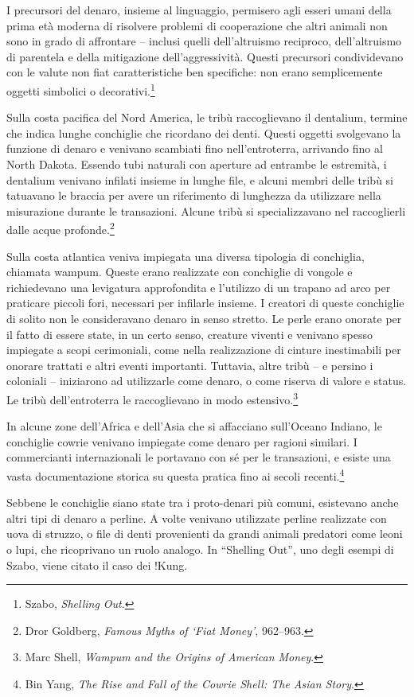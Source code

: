 \documentclass[
  a5paper,
  smalldemyvopaper,10pt,twoside,onecolumn,openright,extrafontsizes,hidelinks]{memoir}
\begin{document}
I precursori del denaro, insieme al linguaggio, permisero agli esseri
umani della prima età moderna di risolvere problemi di cooperazione che
altri animali non sono in grado di affrontare -- inclusi quelli
dell'altruismo reciproco, dell'altruismo di parentela e della
mitigazione dell'aggressività. Questi precursori condividevano con le
valute non fiat caratteristiche ben specifiche: non erano semplicemente
oggetti simbolici o decorativi.\footnote{Szabo, \emph{Shelling Out}.}

Sulla costa pacifica del Nord America, le tribù raccoglievano il
dentalium, termine che indica lunghe conchiglie che ricordano dei denti.
Questi oggetti svolgevano la funzione di denaro e venivano scambiati
fino nell'entroterra, arrivando fino al North Dakota. Essendo tubi
naturali con aperture ad entrambe le estremità, i dentalium venivano
infilati insieme in lunghe file, e alcuni membri delle tribù si
tatuavano le braccia per avere un riferimento di lunghezza da utilizzare
nella misurazione durante le transazioni. Alcune tribù si
specializzavano nel raccoglierli dalle acque profonde.\footnote{Dror
  Goldberg, \emph{Famous Myths of `Fiat Money'}, 962--963.}

Sulla costa atlantica veniva impiegata una diversa tipologia di
conchiglia, chiamata wampum. Queste erano realizzate con conchiglie di
vongole e richiedevano una levigatura approfondita e l'utilizzo di un
trapano ad arco per praticare piccoli fori, necessari per infilarle
insieme. I creatori di queste conchiglie di solito non le consideravano
denaro in senso stretto. Le perle erano onorate per il fatto di essere
state, in un certo senso, creature viventi e venivano spesso impiegate a
scopi cerimoniali, come nella realizzazione di cinture inestimabili per
onorare trattati e altri eventi importanti. Tuttavia, altre tribù -- e
persino i coloniali -- iniziarono ad utilizzarle come denaro, o come
riserva di valore e status. Le tribù dell'entroterra le raccoglievano in
modo estensivo.\footnote{Marc Shell, \emph{Wampum and the Origins of
  American Money}.}

In alcune zone dell'Africa e dell'Asia che si affacciano sull'Oceano
Indiano, le conchiglie cowrie venivano impiegate come denaro per ragioni
similari. I commercianti internazionali le portavano con sé per le
transazioni, e esiste una vasta documentazione storica su questa pratica
fino ai secoli recenti.\footnote{Bin Yang, \emph{The Rise and Fall of
  the Cowrie Shell: The Asian Story}.}

Sebbene le conchiglie siano state tra i proto-denari più comuni,
esistevano anche altri tipi di denaro a perline. A volte venivano
utilizzate perline realizzate con uova di struzzo, o file di denti
provenienti da grandi animali predatori come leoni o lupi, che
ricoprivano un ruolo analogo. In ``Shelling Out'', uno degli esempi di
Szabo, viene citato il caso dei !Kung.
\end{document}
